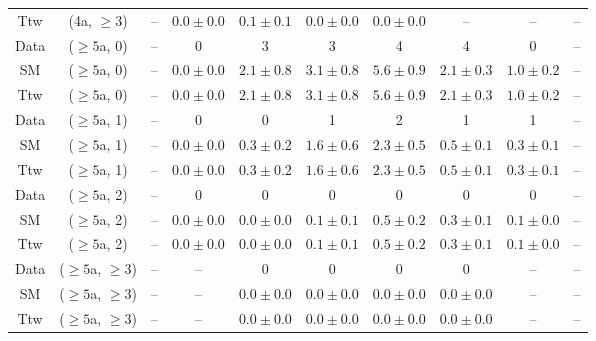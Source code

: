 \begin{table}[h!]
{\begin{tabular}{cccccccccc}
	Ttw & (4a, $\ge3$) & -- & $0.0\pm 0.0$ & $0.1\pm 0.1$ & $0.0\pm 0.0$ & $0.0\pm 0.0$ & -- & -- & -- \\[0.5ex] 
	Data & ($\ge5$a, 0) & -- & 0 & 3 & 3 & 4 & 4 & 0 & -- \\[0.5ex] 
	SM & ($\ge5$a, 0) & -- & $0.0\pm 0.0$ & $2.1\pm 0.8$ & $3.1\pm 0.8$ & $5.6\pm 0.9$ & $2.1\pm 0.3$ & $1.0\pm 0.2$ & -- \\[0.5ex] 
	Ttw & ($\ge5$a, 0) & -- & $0.0\pm 0.0$ & $2.1\pm 0.8$ & $3.1\pm 0.8$ & $5.6\pm 0.9$ & $2.1\pm 0.3$ & $1.0\pm 0.2$ & -- \\[0.5ex] 
	Data & ($\ge5$a, 1) & -- & 0 & 0 & 1 & 2 & 1 & 1 & -- \\[0.5ex] 
	SM & ($\ge5$a, 1) & -- & $0.0\pm 0.0$ & $0.3\pm 0.2$ & $1.6\pm 0.6$ & $2.3\pm 0.5$ & $0.5\pm 0.1$ & $0.3\pm 0.1$ & -- \\[0.5ex] 
	Ttw & ($\ge5$a, 1) & -- & $0.0\pm 0.0$ & $0.3\pm 0.2$ & $1.6\pm 0.6$ & $2.3\pm 0.5$ & $0.5\pm 0.1$ & $0.3\pm 0.1$ & -- \\[0.5ex] 
	Data & ($\ge5$a, 2) & -- & 0 & 0 & 0 & 0 & 0 & 0 & -- \\[0.5ex] 
	SM & ($\ge5$a, 2) & -- & $0.0\pm 0.0$ & $0.0\pm 0.0$ & $0.1\pm 0.1$ & $0.5\pm 0.2$ & $0.3\pm 0.1$ & $0.1\pm 0.0$ & -- \\[0.5ex] 
	Ttw & ($\ge5$a, 2) & -- & $0.0\pm 0.0$ & $0.0\pm 0.0$ & $0.1\pm 0.1$ & $0.5\pm 0.2$ & $0.3\pm 0.1$ & $0.1\pm 0.0$ & -- \\[0.5ex] 
	Data & ($\ge5$a, $\ge3$) & -- & -- & 0 & 0 & 0 & 0 & -- & -- \\[0.5ex] 
	SM & ($\ge5$a, $\ge3$) & -- & -- & $0.0\pm 0.0$ & $0.0\pm 0.0$ & $0.0\pm 0.0$ & $0.0\pm 0.0$ & -- & -- \\[0.5ex] 
	Ttw & ($\ge5$a, $\ge3$) & -- & -- & $0.0\pm 0.0$ & $0.0\pm 0.0$ & $0.0\pm 0.0$ & $0.0\pm 0.0$ & -- & -- \\[0.5ex] 
	\hline
	\hline
\end{tabular}}
\end{table}
